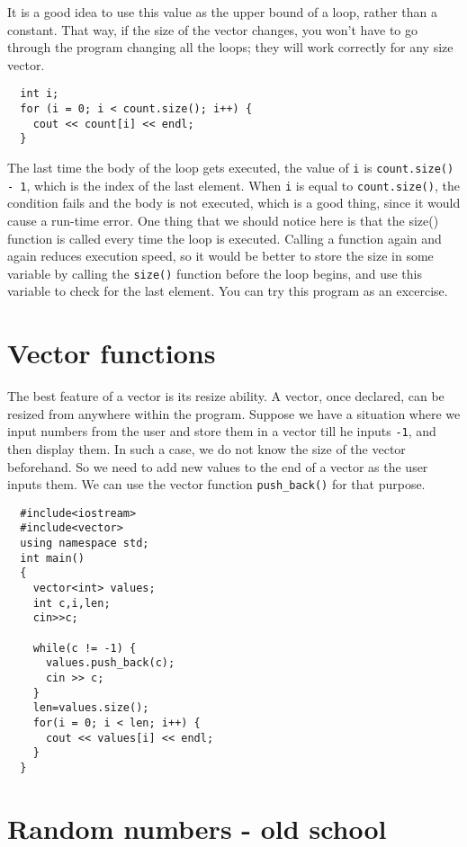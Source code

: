 It is a good idea to use this value as the upper bound of a loop,
rather than a constant.  That way, if the size of the vector
changes, you won't have to go through the program changing all the
loops; they will work correctly for any size vector.

\begin{verbatim}
  int i;
  for (i = 0; i < count.size(); i++) {
    cout << count[i] << endl;
  }
\end{verbatim}
%
The last time the body of the loop gets executed, the value of {\tt i}
is {\tt count.size() - 1}, which is the index of the last element.  When
{\tt i} is equal to {\tt count.size()}, the condition fails and the body
is not executed, which is a good thing, since it would cause a
run-time error. One thing that we should notice here is that the
size() function is called every time the loop is executed. Calling
a function again and again reduces execution speed, so it would be better
to store the size in some variable by calling the {\tt size()} function
before the loop begins, and use this variable to check for the last element.
You can try this program as an excercise.

\section{Vector functions}

The best feature of a vector is its resize ability. A vector, once declared,
can be resized from anywhere within the program. Suppose we have a situation
where we input numbers from the user and store them in a vector till he
inputs {\tt -1}, and then display them. In such a case, we do not know the size of the
vector beforehand. So we need to add new values to the end of
a vector as the user inputs them. We can use the vector
function {\tt push\_back()} for that purpose.

\begin{verbatim}
  #include<iostream>
  #include<vector>
  using namespace std;
  int main()
  {
    vector<int> values;
    int c,i,len;
    cin>>c;
    
    while(c != -1) {
      values.push_back(c);
      cin >> c;
    }
    len=values.size();
    for(i = 0; i < len; i++) {
      cout << values[i] << endl;
    }
  }

\end{verbatim}

\section{Random numbers - old school}
\label{random}
\label{pseudorandom}

